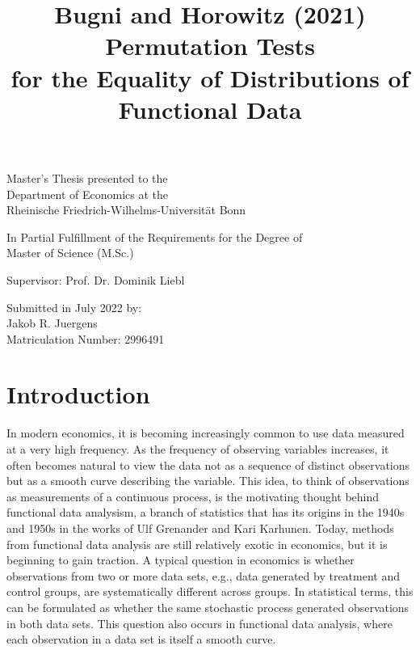\documentclass[12pt, a4paper]{article}
\theoremstyle{MAstyle} \newtheorem{assumption}{Assumption}[section]
\theoremstyle{MAstyle} \newtheorem{definition}{Definition}[section]
\theoremstyle{MAstyle} \newtheorem{theorem}{Theorem}[section]
\begin{document}
	
	\title{{\huge Bugni and Horowitz (2021) Permutation Tests\\ for the Equality of Distributions of\\ Functional Data}}
	\date{}
	\maketitle
	\thispagestyle{empty}
	\vspace{1.5 cm}
	\begin{center}
		
		\Large
		Master's Thesis presented to the\\
		Department of Economics at the\\
		Rheinische Friedrich-Wilhelms-Universität Bonn
		\vspace{1.5cm}

		\large
		In Partial Fulfillment of the Requirements for the Degree of\\
		Master of Science (M.Sc.)
		
		\vspace{3cm}
		
		Supervisor: Prof. Dr. Dominik Liebl
		
		\vspace{3cm}
		
		Submitted in July 2022 by: \\
		Jakob R. Juergens\\
		Matriculation Number: 2996491
	\end{center}
	
	\newpage
	
	\thispagestyle{empty}
	\tableofcontents
	\thispagestyle{empty}
	
	\newpage
	
	\section{Introduction}
		In modern economics, it is becoming increasingly common to use data measured at a very high frequency. As the frequency of observing variables increases, it often becomes natural to view the data not as a sequence of distinct observations but as a smooth curve describing the variable.
		This idea, to think of observations as measurements of a continuous process, is the motivating thought behind functional data analysism, a branch of statistics that has its origins in the 1940s and 1950s in the works of Ulf Grenander and Kari Karhunen. Today, methods from functional data analysis are still relatively exotic in economics, but it is beginning to gain traction.
		A typical question in economics is whether observations from two or more data sets, e.g., data generated by treatment and control groups, are systematically different across groups. In statistical terms, this can be formulated as whether the same stochastic process generated observations in both data sets.			
		This question also occurs in functional data analysis, where each observation in a data set is itself a smooth curve. \\
		
\end{document}
